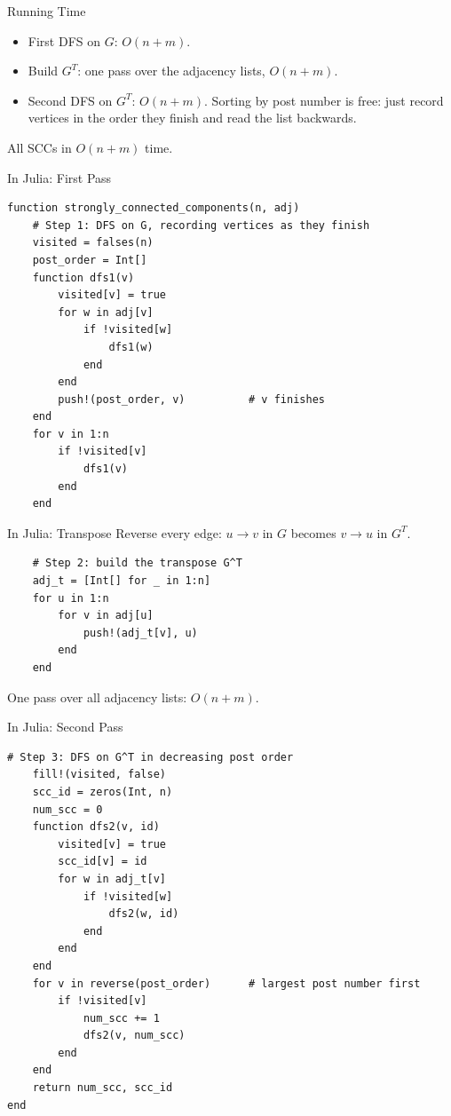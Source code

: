 \documentclass[10pt,aspectratio=169]{beamer}
\begin{document}
\begin{frame}{Running Time}
  \begin{itemize}
    \item First DFS on $G$: $O(n + m)$.
    \item Build $G^T$: one pass over the adjacency lists, $O(n + m)$.
    \item Second DFS on $G^T$: $O(n + m)$. Sorting by post number is free:
          just record vertices in the order they finish and read the list
          backwards.
  \end{itemize}

  \bigskip
  \begin{alertblock}{}
    \centering All SCCs in $O(n + m)$ time.
  \end{alertblock}
\end{frame}

\begin{frame}[fragile]{In Julia: First Pass}
\begin{lstlisting}[basicstyle=\ttfamily\scriptsize]
function strongly_connected_components(n, adj)
    # Step 1: DFS on G, recording vertices as they finish
    visited = falses(n)
    post_order = Int[]
    function dfs1(v)
        visited[v] = true
        for w in adj[v]
            if !visited[w]
                dfs1(w)
            end
        end
        push!(post_order, v)          # v finishes
    end
    for v in 1:n
        if !visited[v]
            dfs1(v)
        end
    end
\end{lstlisting}
\end{frame}

\begin{frame}[fragile]{In Julia: Transpose}
  Reverse every edge: $u \to v$ in $G$ becomes $v \to u$ in $G^T$.

  \bigskip
\begin{lstlisting}
    # Step 2: build the transpose G^T
    adj_t = [Int[] for _ in 1:n]
    for u in 1:n
        for v in adj[u]
            push!(adj_t[v], u)
        end
    end
\end{lstlisting}

  \bigskip
  \begin{center}
    One pass over all adjacency lists: $O(n + m)$.
  \end{center}
\end{frame}

\begin{frame}[fragile]{In Julia: Second Pass}
\begin{lstlisting}[basicstyle=\ttfamily\scriptsize]
    # Step 3: DFS on G^T in decreasing post order
    fill!(visited, false)
    scc_id = zeros(Int, n)
    num_scc = 0
    function dfs2(v, id)
        visited[v] = true
        scc_id[v] = id
        for w in adj_t[v]
            if !visited[w]
                dfs2(w, id)
            end
        end
    end
    for v in reverse(post_order)      # largest post number first
        if !visited[v]
            num_scc += 1
            dfs2(v, num_scc)
        end
    end
    return num_scc, scc_id
end
\end{lstlisting}
\end{frame}
\end{document}
